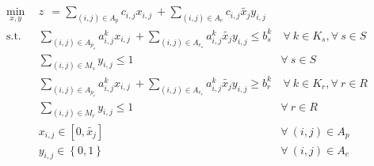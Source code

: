 \begin{subequations}\label{eqs:NFCTP}
  \begin{align}
    \min_{x, y} \:\: 
    & 
    z \:\: = 
    \sum_{(i, j) \in A_p} c_{i,j} x_{i,j} 
    \: + 
    \sum_{(i, j) \in A_e} c_{i,j} \tilde{x_j} y_{i,j} 
    & 
    \label{eqs:NFCTP_obj} \\
    \text{s.t.} \:\: 
    &
    \sum_{(i, j) \in A_{p_s}} a^k_{i,j} x_{i,j}
    \: + 
    \sum_{(i, j) \in A_{e_s}} a^k_{i,j} \tilde{x_j} y_{i,j}
    \leq b^k_s 
    &
    \: 
    \forall \: k \in K_s, 
    \forall \: s \in S 
    \label{eqs:NFCTP_sup} \\
    &
    \sum_{(i, j) \in M_{s}} y_{i,j} \leq 1 
    &
    \forall \: s \in S 
    \label{eqs:NFCTP_mut_sup} \\
    &
    \sum_{(i, j) \in A_{p_r}} a^k_{i,j} x_{i,j}
    \: + 
    \sum_{(i, j) \in A_{e_r}} a^k_{i,j} \tilde{x_j} y_{i,j}
    \geq b^k_r 
    &
    \: 
    \forall \: k \in K_r,  
    \forall \: r \in R 
    \label{eqs:NFCTP_req} \\
    &
    \sum_{(i, j) \in M_{r}} y_{i,j} \leq 1 
    &
    \forall \: r \in R 
    \label{eqs:NFCTP_mut_req} \\
    &
    x_{i,j} \in [0, \tilde{x_j}]
    &
    \forall \: (i, j) \in A_p
    \label{eqs:NFCTP_x} \\
    &
    y_{i,j} \in \left\{ 0, 1 \right\}
    &
    \forall \: (i, j) \in A_e
    \label{eqs:NFCTP_y}
  \end{align}
\end{subequations}

